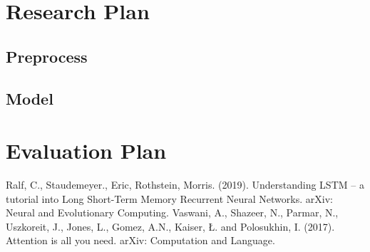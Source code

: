 \documentclass[conference]{IEEEtran}
\begin{document}
\section{Research Plan}
\subsection{Preprocess}
\subsection{Model}

\section{Evaluation Plan}

\begin{thebibliography}{1,2}
Ralf, C., Staudemeyer., Eric, Rothstein, Morris. (2019). Understanding LSTM -- a tutorial into Long Short-Term Memory Recurrent Neural Networks. arXiv: Neural and Evolutionary Computing.
Vaswani, A., Shazeer, N., Parmar, N., Uszkoreit, J., Jones, L., Gomez, A.N., Kaiser, Ł. and Polosukhin, I. (2017). Attention is all you need. arXiv: Computation and Language.
\end{thebibliography}
\end{document}
